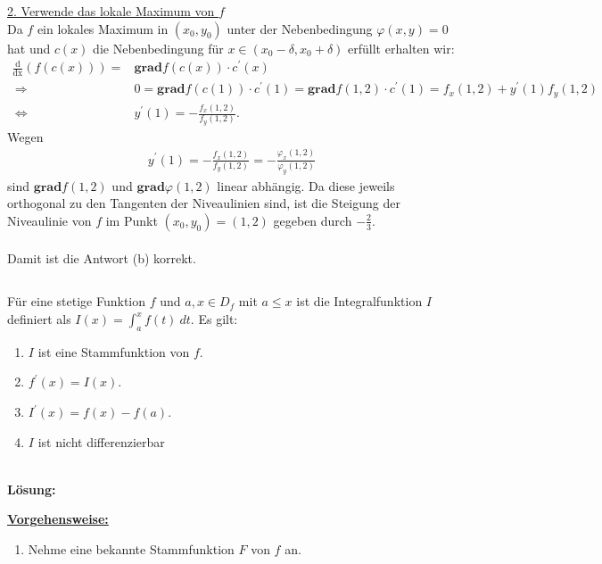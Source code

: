 \newpage
\underline{2. Verwende das lokale Maximum von $ f $}\\
Da $ f $ ein lokales Maximum in $ (x_0,y_0) $ unter der Nebenbedingung $ \varphi(x,y) = 0 $ hat und $ c(x) $ die Nebenbedingung für $ x \in (x_0- \delta, x_0 + \delta) $ erfüllt erhalten wir:
\begin{align*}
 \frac{\mathrm{d}}{\mathrm{dx}} (f(c(x))) =
&  \textbf{grad} f(c(x)) \cdot c^\prime(x)\\
\ \Rightarrow \
&0 =\textbf{grad} f(c(1)) \cdot c^\prime(1)
=
\textbf{grad} f(1,2) \cdot c^\prime(1) 
=
f_x(1,2) + y^\prime(1) f_y(1,2)\\
\ \Leftrightarrow \
&y^\prime(1) = - \frac{f_x(1,2)}{f_y(1,2)}.
\end{align*}
Wegen 
\begin{align*}
y^\prime(1)= - \frac{f_x(1,2)}{f_y(1,2)} = - \frac{\varphi_x(1,2)}{\varphi_y(1,2)} 
\end{align*}
sind $ \textbf{grad} f(1,2)  $ und $ \textbf{grad} \varphi(1,2)  $ linear abhängig.
Da diese jeweils orthogonal zu den Tangenten der Niveaulinien sind, ist die Steigung der Niveaulinie von $ f $ im Punkt $ (x_0,y_0) = (1,2) $ gegeben durch $ -\frac{2}{3} $.\\
\\
Damit ist die Antwort (b) korrekt.

\newpage

\subsection*{}
Für eine stetige Funktion $ f $ und $ a,x \in D_f $ mit $ a \leq x  $ ist die Integralfunktion $ I $ definiert als $ I(x) = \int_a^x f(t) \ dt $. Es gilt:
\renewcommand{\labelenumi}{(\alph{enumi})}
\begin{enumerate}
	\item 
	$ I $ ist eine Stammfunktion von $ f $.
	\item
	$ f^\prime(x) = I(x) $.
	\item
	$ I^\prime(x) = f(x) - f(a) $.
	\item
	$ I $ ist nicht differenzierbar
\end{enumerate}
\ \\
\textbf{Lösung:}
\begin{mdframed}
\underline{\textbf{Vorgehensweise:}}
\renewcommand{\labelenumi}{\theenumi.}
\begin{enumerate}
\item Nehme eine bekannte Stammfunktion $ F $ von $ f $ an.
\end{enumerate}
\end{mdframed}

